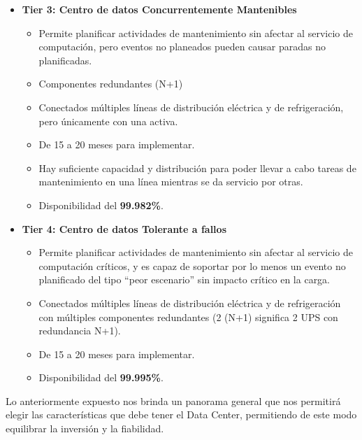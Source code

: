 \begin{itemize}
          \item  \textbf{Tier 3: Centro de datos Concurrentemente Mantenibles}
            \begin{itemize}
                \item Permite planificar actividades de mantenimiento sin afectar al servicio de computación, pero eventos no planeados pueden causar paradas no planificadas.
                \item  Componentes redundantes (N+1)
                \item Conectados  múltiples líneas de distribución eléctrica y de refrigeración, pero únicamente con una activa.
                \item De 15 a 20 meses para implementar.
                \item Hay suficiente capacidad y distribución para poder llevar a cabo tareas de mantenimiento en una línea mientras se da servicio por otras.
                \item Disponibilidad del \textbf{99.982\%}.
            \end{itemize}


          \item  \textbf{Tier 4: Centro de datos Tolerante a fallos} 
            \begin{itemize}
                \item  Permite planificar actividades de mantenimiento sin afectar al servicio de computación críticos, y es capaz de soportar por lo menos un evento no planificado del tipo ``peor escenario'' sin impacto crítico en la carga.
                \item  Conectados múltiples líneas de distribución eléctrica y de refrigeración con múltiples componentes redundantes (2 (N+1) significa 2 UPS con redundancia N+1).
                \item  De 15 a 20 meses para implementar.
                \item Disponibilidad del \textbf{99.995\%}.
            \end{itemize}

      \end{itemize}

  Lo anteriormente expuesto nos brinda un panorama general que nos permitirá elegir las características que debe tener el Data Center, permitiendo de este modo equilibrar la inversión y la fiabilidad.
  
